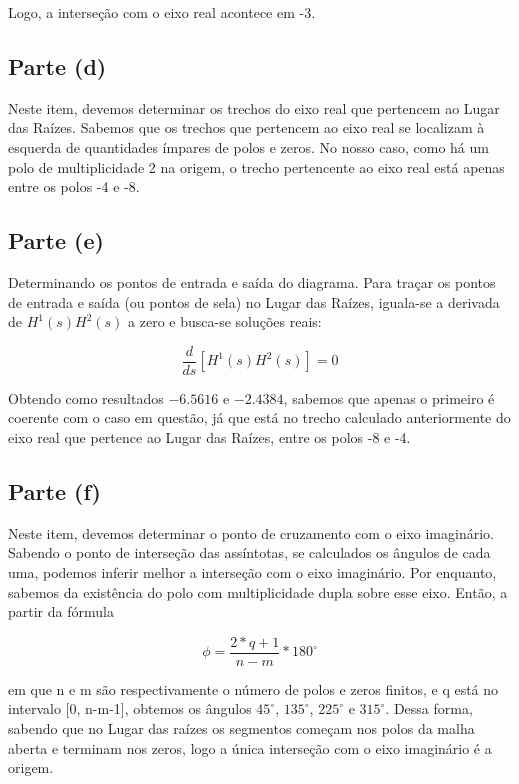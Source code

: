 \documentclass[a4paper, 12pt]{article}
\begin{document}
Logo, a interseção com o eixo real acontece em -3.

\subsection{Parte (d)}
Neste item, devemos determinar os trechos do eixo real que pertencem ao Lugar das Raízes. Sabemos que os trechos que pertencem ao eixo real se localizam à esquerda de quantidades ímpares de polos e zeros. No nosso caso, como há um polo de multiplicidade 2 na origem, o trecho pertencente ao eixo real está apenas entre os polos -4 e -8.

\subsection{Parte (e)}
Determinando os pontos de entrada e saída do diagrama. Para traçar os pontos de entrada e saída (ou pontos de sela) no Lugar das Raízes, iguala-se a derivada de $H^1(s)H^2(s)$ a zero e busca-se 
soluções reais:

\begin{equation}\label{eq: diff_H1_H2}
    \frac{d}{ds}[H^1(s)H^2(s)] = 0
\end{equation}

 Obtendo como resultados $-6.5616$ e $-2.4384$, sabemos que apenas o primeiro é coerente com o caso em questão, já que está no trecho calculado anteriormente do eixo real que pertence ao Lugar das Raízes, entre os polos -8 e -4.

\subsection{Parte (f)}
Neste item, devemos determinar o ponto de cruzamento com o eixo imaginário. Sabendo o ponto de interseção das assíntotas, se calculados os ângulos de cada uma, podemos inferir melhor a interseção com o eixo imaginário. Por enquanto, sabemos da existência do polo com multiplicidade dupla sobre esse eixo. Então, a partir da fórmula

\begin{equation}\label{eq: assymptotes_angles}
    \phi=\frac{2*q + 1}{n - m}*180^{\circ}
\end{equation}

em que n e m são respectivamente o número de polos e zeros finitos, e q está no intervalo [0, n-m-1], obtemos os ângulos $45^{\circ}$, $135^{\circ}$, $225^{\circ}$ e $315^{\circ}$. Dessa forma, sabendo que no Lugar das raízes os segmentos começam nos polos da malha aberta e terminam nos zeros, logo a única interseção com o eixo imaginário é a origem.
\end{document}
